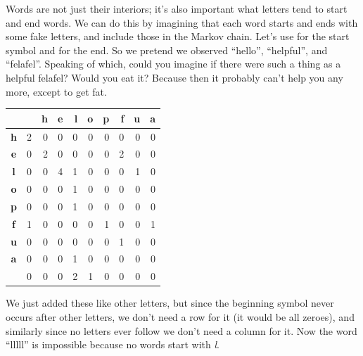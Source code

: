 \documentclass[twocolumn]{article}
\begin{document}
Words are not just their interiors; it's also important what letters
tend to start and end words. We can do this by imagining that each
word starts and ends with some fake letters, and include those in the
Markov chain. Let's use {\bf \<} for the start symbol and {\bf \>} for
the end. So we pretend we observed ``\<hello\>'', ``\<helpful\>'', and
``\<felafel\>''. Speaking of which, could you imagine if there were such
a thing as a helpful felafel? Would you eat it? Because then it
probably can't help you any more, except to get fat.

\vspace{0.2in}
\begin{centering}
\begin{tabular}{|c|r|r|r|r|r|r|r|r|r|} %
\hline
\,  &  {\bf \<}    & {\bf h}   & {\bf e}   & {\bf l}   & {\bf o}   & {\bf p}   & {\bf f}   & {\bf u}   & {\bf a}    \\
\hline  %
{\bf h} &  2  &  0   & 0   & 0   & 0   & 0   & 0   & 0   & 0    \\
\hline    
{\bf e} &  0  &  2   & 0   & 0   & 0   & 0   & 2   & 0   & 0    \\
\hline    
{\bf l} &  0  &  0   & 4   & 1   & 0   & 0   & 0   & 1   & 0    \\
\hline    
{\bf o} &  0  &  0   & 0   & 1   & 0   & 0   & 0   & 0   & 0    \\
\hline    
{\bf p} &  0  &  0   & 0   & 1   & 0   & 0   & 0   & 0   & 0    \\
\hline    
{\bf f} &  1  &  0   & 0   & 0   & 0   & 1   & 0   & 0   & 1    \\
\hline    
{\bf u} &  0  &  0   & 0   & 0   & 0   & 0   & 1   & 0   & 0    \\
\hline    
{\bf a} &  0  &  0   & 0   & 1   & 0   & 0   & 0   & 0   & 0    \\
\hline    
{\bf \>} &  0  &  0   & 0   & 2   & 1   & 0   & 0   & 0   & 0    \\
\hline
\end{tabular}
\end{centering}
\vspace{0.2in}

We just added these like other letters, but since the beginning symbol
{\bf \<} never occurs after other letters, we don't need a row for it
(it would be all zeroes), and similarly since no letters ever follow
{\bf \>} we don't need a column for it. Now the word ``lllll'' is
impossible because no words start with {\it l}.
\end{document}
